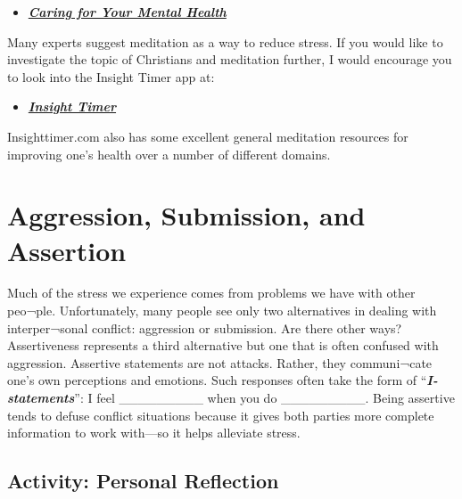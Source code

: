 \documentclass[
]{book}
\providecommand{\tightlist}{%
  \setlength{\itemsep}{0pt}\setlength{\parskip}{0pt}}
\begin{document}
\begin{itemize}
\tightlist
\item
  \href{https://www.nimh.nih.gov/health/topics/caring-for-your-mental-health}{\textbf{\emph{Caring for Your Mental Health}}}
\end{itemize}

Many experts suggest meditation as a way to reduce stress. If you would like to investigate the topic of Christians and meditation further, I would encourage you to look into the Insight Timer app at:

\begin{itemize}
\tightlist
\item
  \href{https://insighttimer.com/meditation-topics/christianity}{\textbf{\emph{Insight Timer}}}
\end{itemize}

Insighttimer.com also has some excellent general meditation resources for improving one's health over a number of different domains.

\hypertarget{aggression-submission-and-assertion}{%
\section{Aggression, Submission, and Assertion}\label{aggression-submission-and-assertion}}

Much of the stress we experience comes from problems we have with other peo¬ple. Unfortunately, many people see only two alternatives in dealing with interper¬sonal conflict: aggression or submission. Are there other ways?
Assertiveness represents a third alternative but one that is often confused with aggression. Assertive statements are not attacks. Rather, they communi¬cate one's own perceptions and emotions. Such responses often take the form of ``\textbf{\emph{I-statements}}'': I feel \_\_\_\_\_\_\_\_\_ when you do \_\_\_\_\_\_\_\_\_. Being assertive tends to defuse conflict situations because it gives both parties more complete information to work with---so it helps alleviate stress.

\hypertarget{activity-personal-reflection}{%
\subsection*{Activity: Personal Reflection}\label{activity-personal-reflection}}
\end{document}
